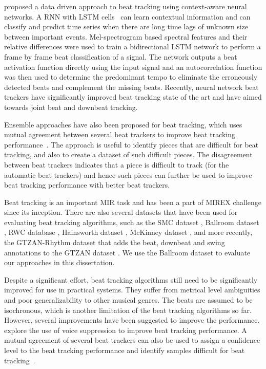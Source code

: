  proposed a data driven approach to beat tracking using context-aware neural networks. A \gls{RNN} with \gls{LSTM} cells~\cite{hochreiter:97:lstm} can learn contextual information and can classify and predict time series when there are long time lags of unknown size between important events. Mel-spectrogram based spectral features and their relative differences were used to train a bidirectional \gls{LSTM} network to perform a frame by frame beat classification of a signal. The network outputs a beat activation function directly using the input signal and an autocorrelation function was then used to determine the predominant tempo to eliminate the erroneously detected beats and complement the missing beats. Recently, neural network beat trackers have significantly improved beat tracking state of the art and have aimed towards joint beat and downbeat tracking. 

Ensemble approaches have also been proposed for beat tracking, which uses mutual agreement between several beat trackers to improve beat tracking performance~\cite{holzapfel:12:beat}. The approach is useful to identify pieces that are difficult for beat tracking, and also to create a dataset of such difficult pieces. The disagreement between beat trackers indicates that a piece is difficult to track (for the automatic beat trackers) and hence such pieces can further be used to improve beat tracking performance with better beat trackers. 

Beat tracking is an important \gls{MIR} task and has been a part of \gls{MIREX} challenge since its inception. There are also several datasets that have been used for evaluating beat tracking algorithms, such as the SMC dataset \cite{holzapfel:12:beat}, Ballroom dataset \cite{gouyon:06:tempo,dixon:04:pattern,bock:11:nnbeat}, RWC database \cite{goto:06:rwc}, Hainsworth dataset \cite{hainsworth:03:pfbeat}, McKinney dataset \cite{moelants:04:tempo}, and more recently, the GTZAN-Rhythm dataset \cite{marchand:15:gtzanrhythm} that adds the beat, downbeat and swing annotations to the GTZAN dataset \cite{tzanetakis:02:genre}. We use the Ballroom dataset to evaluate our approaches in this dissertation. 

Despite a significant effort, beat tracking algorithms still need to be significantly improved for use in practical systems. They suffer from metrical level ambiguities and poor generalizability to other musical genres. The beats are assumed to be isochronous, which is another limitation of the beat tracking algorithms so far. However, several improvements have been suggested to improve the performance.  explore the use of voice suppression to improve beat tracking performance. A mutual agreement of several beat trackers can also be used to assign a confidence level to the beat tracking performance and identify samples difficult for beat tracking~\cite{holzapfel:12:beat,zapata:12:beat}. 
